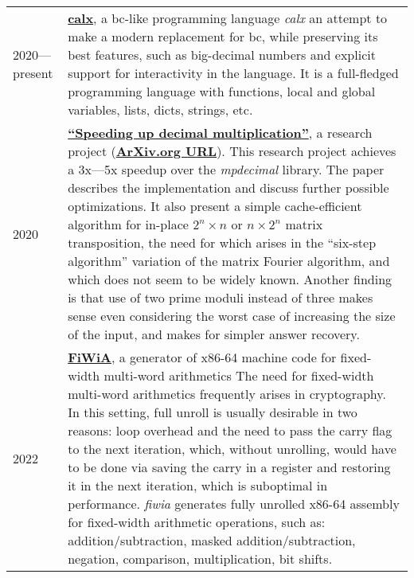 \documentclass[10pt]{article}
\begin{document}
\begin{tabularx}{\textwidth}{ l X }
    2020---present & \href{https://github.com/shdown/calx}{\textbf{calx}}, a bc-like programming language
    \newline
    \footnotesize{
        \textit{calx} an attempt to make a modern replacement for bc, while preserving its best features, such as big-decimal numbers and explicit support for interactivity in the language.
        It is a full-fledged programming language with functions, local and global variables, lists, dicts, strings, etc.
    }
    \\
    \medskip

    2020 & \href{https://github.com/shdown/decimal-multiplication-paper}{\textbf{``Speeding up decimal multiplication''}}, a research project (\href{https://arxiv.org/abs/2011.11524}{\textbf{ArXiv.org URL}}).
    \newline
    \footnotesize{
        This research project achieves a 3x---5x speedup over the \textit{mpdecimal} library.
        The paper describes the implementation and discuss further possible optimizations. It also present a simple cache-efficient algorithm for in-place
        $2^n \times n$ or $n \times 2^n$ matrix transposition, the need for which arises in the
        ``six-step algorithm'' variation of the matrix Fourier algorithm, and
        which does not seem to be widely known. Another finding is that use
        of two prime moduli instead of three makes sense even considering the
        worst case of increasing the size of the input, and makes for simpler
        answer recovery.
    }
    \\
    \medskip

    2022 & \href{https://github.com/shdown/fiwia}{\textbf{FiWiA}}, a generator of x86-64 machine code for fixed-width multi-word arithmetics
    \newline
    \footnotesize{
        The need for fixed-width multi-word arithmetics frequently arises in cryptography.
        In this setting, full unroll is usually desirable in two reasons: loop overhead and the need to pass the carry flag to the next iteration,
        which, without unrolling, would have to be done via saving the carry in a register and restoring it in the next iteration,
        which is suboptimal in performance.
        \textit{fiwia} generates fully unrolled x86-64 assembly for fixed-width arithmetic operations, such as:
        addition/subtraction,
        masked addition/subtraction,
        negation,
        comparison,
        multiplication,
        bit shifts.
    }
    \\
\end{tabularx}
\end{document}
